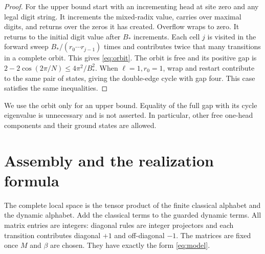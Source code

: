 \begin{proof}
For the upper bound start with an incrementing head at site zero and any
legal digit string. It increments the mixed-radix value, carries over
maximal digits, and returns over the zeros it has created. Overflow wraps
to zero. It returns to the initial digit value after $B_*$ increments.
Each cell $j$ is visited in the forward sweep $B_*/(r_0\cdots r_{j-1})$
times and contributes twice that many transitions in a complete orbit.
This gives \eqref{eq:orbit}. The orbit is free and its positive gap is
$2-2\cos(2\pi/N)\leq4\pi^2/B_*^2$.
When $\ell=1,r_0=1$, wrap and restart contribute to the same pair of
states, giving the double-edge cycle with gap four. This case satisfies
the same inequalities.
\end{proof}

We use the orbit only for an upper bound. Equality of the full gap with
its cycle eigenvalue is unnecessary and is not asserted. In particular,
other free one-head components and their ground states are allowed.

\section{Assembly and the realization formula}\label{sec:assembly}
The complete local space is the tensor product of the finite classical
alphabet and the dynamic alphabet. Add the classical terms to the
guarded dynamic terms. All matrix entries are integers: diagonal rules
are integer projectors and each transition contributes diagonal $+1$
and off-diagonal $-1$. The matrices are fixed once $M$ and $\beta$ are
chosen. They have exactly the form \eqref{eq:model}.

